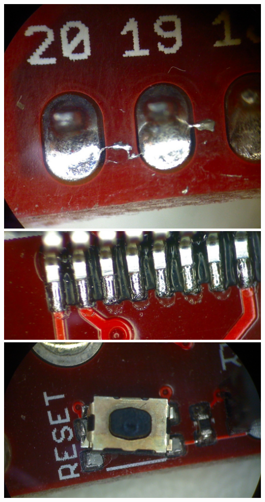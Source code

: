 \documentclass[a4paper,12pt]{report}
\begin{document}
\begin{center}
\includegraphics[width=\linewidth]{header-short}
\includegraphics[width=\linewidth]{unmelted-solder}
\includegraphics[width=\linewidth]{overheated-reset-button}
\end{center}
\end{document}
